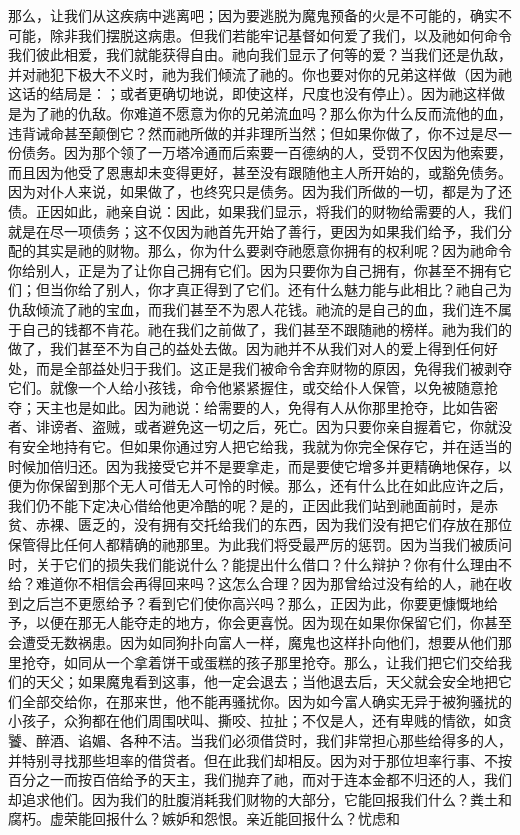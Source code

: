 那么，让我们从这疾病中逃离吧；因为要逃脱为魔鬼预备的火是不可能的，确实不可能，除非我们摆脱这病患。但我们若能牢记基督如何爱了我们，以及祂如何命令我们彼此相爱，我们就能获得自由。祂向我们显示了何等的爱？当我们还是仇敌，并对祂犯下极大不义时，祂为我们倾流了祂的。你也要对你的兄弟这样做（因为祂这话的结局是：；或者更确切地说，即使这样，尺度也没有停止）。因为祂这样做是为了祂的仇敌。你难道不愿意为你的兄弟流血吗？那么你为什么反而流他的血，违背诫命甚至颠倒它？然而祂所做的并非理所当然；但如果你做了，你不过是尽一份债务。因为那个领了一万塔冷通而后索要一百德纳的人，受罚不仅因为他索要，而且因为他受了恩惠却未变得更好，甚至没有跟随他主人所开始的，或豁免债务。因为对仆人来说，如果做了，也终究只是债务。因为我们所做的一切，都是为了还债。正因如此，祂亲自说：因此，如果我们显示，将我们的财物给需要的人，我们就是在尽一项债务；这不仅因为祂首先开始了善行，更因为如果我们给予，我们分配的其实是祂的财物。那么，你为什么要剥夺祂愿意你拥有的权利呢？因为祂命令你给别人，正是为了让你自己拥有它们。因为只要你为自己拥有，你甚至不拥有它们；但当你给了别人，你才真正得到了它们。还有什么魅力能与此相比？祂自己为仇敌倾流了祂的宝血，而我们甚至不为恩人花钱。祂流的是自己的血，我们连不属于自己的钱都不肯花。祂在我们之前做了，我们甚至不跟随祂的榜样。祂为我们的做了，我们甚至不为自己的益处去做。因为祂并不从我们对人的爱上得到任何好处，而是全部益处归于我们。这正是我们被命令舍弃财物的原因，免得我们被剥夺它们。就像一个人给小孩钱，命令他紧紧握住，或交给仆人保管，以免被随意抢夺；天主也是如此。因为祂说：给需要的人，免得有人从你那里抢夺，比如告密者、诽谤者、盗贼，或者避免这一切之后，死亡。因为只要你亲自握着它，你就没有安全地持有它。但如果你通过穷人把它给我，我就为你完全保存它，并在适当的时候加倍归还。因为我接受它并不是要拿走，而是要使它增多并更精确地保存，以便为你保留到那个无人可借无人可怜的时候。那么，还有什么比在如此应许之后，我们仍不能下定决心借给他更冷酷的呢？是的，正因此我们站到祂面前时，是赤贫、赤裸、匮乏的，没有拥有交托给我们的东西，因为我们没有把它们存放在那位保管得比任何人都精确的祂那里。为此我们将受最严厉的惩罚。因为当我们被质问时，关于它们的损失我们能说什么？能提出什么借口？什么辩护？你有什么理由不给？难道你不相信会再得回来吗？这怎么合理？因为那曾给过没有给的人，祂在收到之后岂不更愿给予？看到它们使你高兴吗？那么，正因为此，你要更慷慨地给予，以便在那无人能夺走的地方，你会更喜悦。因为现在如果你保留它们，你甚至会遭受无数祸患。因为如同狗扑向富人一样，魔鬼也这样扑向他们，想要从他们那里抢夺，如同从一个拿着饼干或蛋糕的孩子那里抢夺。那么，让我们把它们交给我们的天父；如果魔鬼看到这事，他一定会退去；当他退去后，天父就会安全地把它们全部交给你，在那来世，他不能再骚扰你。因为如今富人确实无异于被狗骚扰的小孩子，众狗都在他们周围吠叫、撕咬、拉扯；不仅是人，还有卑贱的情欲，如贪饕、醉酒、谄媚、各种不洁。当我们必须借贷时，我们非常担心那些给得多的人，并特别寻找那些坦率的借贷者。但在此我们却相反。因为对于那位坦率行事、不按百分之一而按百倍给予的天主，我们抛弃了祂，而对于连本金都不归还的人，我们却追求他们。因为我们的肚腹消耗我们财物的大部分，它能回报我们什么？粪土和腐朽。虚荣能回报什么？嫉妒和怨恨。亲近能回报什么？忧虑和